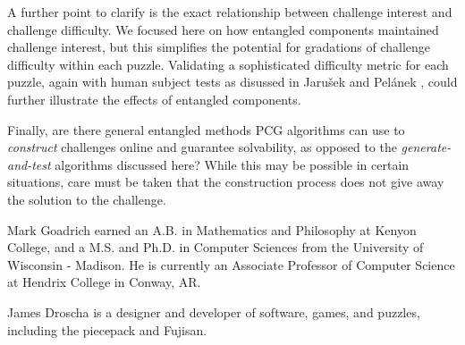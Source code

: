 \documentclass[journal]{IEEEtran}
\begin{document}
A further point to clarify is the exact relationship between challenge interest and challenge difficulty. We focused here on how entangled components maintained challenge interest, but this simplifies the potential for gradations of challenge difficulty within each puzzle. Validating a sophisticated difficulty metric for each puzzle, again with human subject tests as disussed in Jaru{\v{s}}ek and Pel{\'a}nek \cite{jaruvsek2011determines}
, could further illustrate the effects of entangled components.

%

Finally, are there general entangled methods PCG algorithms can use to {\it construct} challenges online and guarantee solvability, as opposed to the {\it generate-and-test} algorithms discussed here? While this may be possible in certain situations, 
%
care must be taken that the construction process does not give away the solution to the challenge.


%

%

%
%

%



%
%
\ifCLASSOPTIONcaptionsoff
  \newpage
\fi



%
%
%
%
%
%
%

%

%
%
%
%
%

%

%
%
%
%
%
%
%
%
%
%
%
%

\begin{IEEEbiography}{Mark Goadrich} earned an A.B. in Mathematics and Philosophy at Kenyon College, and a M.S. and Ph.D. in Computer Sciences from the University of Wisconsin - Madison.
He is currently an Associate Professor of Computer Science at Hendrix College in Conway, AR.
\end{IEEEbiography}

%
\begin{IEEEbiography}{James Droscha}
is a designer and developer of software, games, and puzzles, including the piecepack and Fujisan.
\end{IEEEbiography}

%
%
%

%
%
%
%
%

\vfill

%
%
%



%
\end{document}
